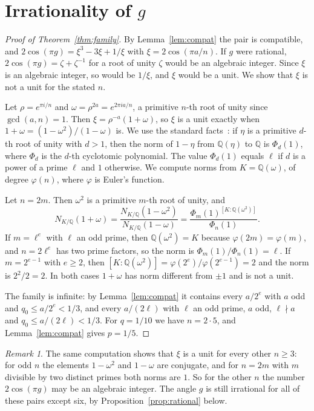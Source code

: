 \documentclass[11pt]{amsart}
\theoremstyle{remark}
\newtheorem{remark}[theorem]{Remark}
\numberwithin{equation}{section}
\begin{document}
\section{Irrationality of \texorpdfstring{$g$}{g}}\label{sec:family}

\begin{proof}[Proof of Theorem~\ref{thm:family}]
By Lemma~\ref{lem:compat} the pair is compatible, and
$2\cos(\pi g)=\xi^3-3\xi+1/\xi$ with $\xi=2\cos(\pi a/n)$. If $g$ were rational,
$2\cos(\pi g)=\zeta+\zeta^{-1}$ for a root of unity $\zeta$ would be an
algebraic integer. Since $\xi$ is an algebraic integer, so would be $1/\xi$,
and $\xi$ would be a unit. We show that $\xi$ is not a unit for the stated $n$.

Let $\rho=e^{\pi i/n}$ and $\omega=\rho^{2a}=e^{2\pi ia/n}$, a primitive
$n$-th root of unity since $\gcd(a,n)=1$. Then $\xi=\rho^{-a}(1+\omega)$,
so $\xi$ is a unit exactly when $1+\omega=(1-\omega^2)/(1-\omega)$ is. We
use the standard facts~\cite[Chapter~2]{Was97}: if $\eta$ is a primitive
$d$-th root of unity with $d>1$, then the norm of $1-\eta$ from
$\mathbb Q(\eta)$ to $\mathbb Q$ is $\Phi_d(1)$, where $\Phi_d$ is the
$d$-th cyclotomic polynomial. The value $\Phi_d(1)$ equals $\ell$ if
$d$ is a power of a prime $\ell$ and $1$ otherwise. We compute norms
from $K=\mathbb Q(\omega)$, of degree $\varphi(n)$, where $\varphi$ is
Euler's function.

Let $n=2m$. Then $\omega^2$ is a primitive $m$-th root of unity, and
\[
N_{K/\mathbb Q}(1+\omega)=\frac{N_{K/\mathbb Q}(1-\omega^2)}{N_{K/\mathbb Q}(1-\omega)}
=\frac{\Phi_m(1)^{[K:\mathbb Q(\omega^2)]}}{\Phi_n(1)} .
\]
If $m=\ell^e$ with $\ell$ an odd prime, then $\mathbb Q(\omega^2)=K$
because $\varphi(2m)=\varphi(m)$, and $n=2\ell^e$ has two prime factors,
so the norm is $\Phi_m(1)/\Phi_n(1)=\ell$. If $m=2^{e-1}$ with $e\ge2$,
then $[K:\mathbb Q(\omega^2)]=\varphi(2^e)/\varphi(2^{e-1})=2$ and the
norm is $2^2/2=2$. In both cases $1+\omega$ has norm different from
$\pm1$ and is not a unit.

The family is infinite: by Lemma~\ref{lem:compat} it contains every
$a/2^e$ with $a$ odd and $q_0\le a/2^e<1/3$, and every $a/(2\ell)$ with
$\ell$ an odd prime, $a$ odd, $\ell\nmid a$ and $q_0\le a/(2\ell)<1/3$.
For $q=1/10$ we have $n=2\cdot5$, and Lemma~\ref{lem:compat} gives
$p=1/5$.
\end{proof}

\begin{remark}
The same computation shows that $\xi$ is a unit for every other $n\ge3$:
for odd $n$ the elements $1-\omega^2$ and $1-\omega$ are conjugate, and for
$n=2m$ with $m$ divisible by two distinct primes both norms are $1$. So
for the other $n$ the number $2\cos(\pi g)$ may be an algebraic integer.
The angle $g$ is still irrational for all of these pairs except six, by
Proposition~\ref{prop:rational} below.
\end{remark}
\end{document}
